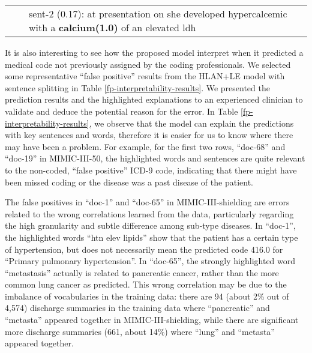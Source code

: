 \documentclass[final,5p,times,twocolumn]{elsarticle}
\begin{document}
\begin{table*}[th]
\begin{tabular}{lp{2.7cm}p{7cm}p{2.7cm}}
                                             &                         & sent-2 (0.17):  at presentation on she developed   hypercalcemic with a \textbf{calcium(1.0)} of an elevated ldh                                                                                                                             & \\
\cline{1-4}
\end{tabular}
\end{table*}

It is also interesting to see how the proposed model interpret when it predicted a medical code not previously assigned by the coding professionals. We selected some representative ``false positive'' results from the HLAN+LE model with sentence splitting in Table \ref{fp-interpretability-results}. We presented the prediction results and the highlighted explanations to an experienced clinician to validate and deduce the potential reason for the error. In Table \ref{fp-interpretability-results}, we observe that the model can explain the predictions with key sentences and words, therefore it is easier for us to know where there may have been a problem. For example, for the first two rows, ``doc-68'' and ``doc-19'' in MIMIC-III-50, the highlighted words and sentences are quite relevant to the non-coded, ``false positive'' ICD-9 code, indicating that there might have been missed coding or the disease was a past disease of the patient.

The false positives in ``doc-1'' and ``doc-65'' in MIMIC-III-shielding are errors related to the wrong correlations learned from the data, particularly regarding the high granularity and subtle difference among sub-type diseases. In ``doc-1'', the highlighted words ``htn elev lipids'' show that the patient has a certain type of hypertension, but does not necessarily mean the predicted code 416.0 for ``Primary pulmonary hypertension''. In ``doc-65'', the strongly highlighted word ``metastasis'' actually is related to pancreatic cancer, rather than the more common lung cancer as predicted. This wrong correlation may be due to the imbalance of vocabularies in the training data: there are 94 (about 2\% out of 4,574) discharge summaries in the training data where ``pancreatic'' and ``metasta'' appeared together in MIMIC-III-shielding, while there are significant more discharge summaries (661, about 14\%) where ``lung'' and ``metasta'' appeared together.
\end{document}
